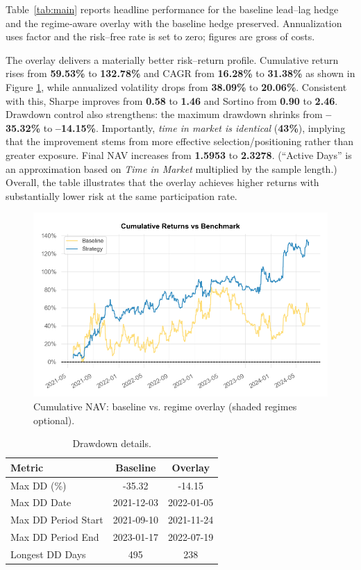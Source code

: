 Table~\ref{tab:main} reports headline performance for the baseline lead--lag hedge and the
regime‐aware overlay with the baseline hedge preserved. Annualization uses factor \annfac{}
and the risk–free rate is set to zero; figures are gross of costs.

The overlay delivers a materially better risk–return profile. Cumulative return rises from
\textbf{59.53\%} to \textbf{132.78\%} and CAGR from \textbf{16.28\%} to \textbf{31.38\%} as shown in Figure \ref{fig:nav}, while
annualized volatility drops from \textbf{38.09\%} to \textbf{20.06\%}. Consistent with this,
Sharpe improves from \textbf{0.58} to \textbf{1.46} and Sortino from \textbf{0.90} to
\textbf{2.46}. Drawdown control also strengthens: the maximum drawdown shrinks from
\textbf{--35.32\%} to \textbf{--14.15\%}. Importantly, \emph{time in market is identical}
(\textbf{43\%}), implying that the improvement stems from more effective selection/positioning
rather than greater exposure. Final NAV increases from \textbf{1.5953} to \textbf{2.3278}.
(“Active Days” is an approximation based on \emph{Time in Market} multiplied by the sample length.)
Overall, the table illustrates that the overlay achieves higher returns with substantially
lower risk at the same participation rate.

\begin{figure}[t]
\centering
\includegraphics[width=0.9\linewidth]{headline_plots/NAV.png}%
\caption{Cumulative NAV: baseline vs. regime overlay (shaded regimes optional).}
\label{fig:nav}
\end{figure}


\begin{table}[t]
\centering
\caption{Drawdown details.}
\label{tab:diag_dd}
\small
\begin{tabular}{lcc}
\toprule
Metric & Baseline & Overlay \\
\midrule
Max DD (\%)          & -35.32 & -14.15 \\
Max DD Date          & 2021-12-03 & 2022-01-05 \\
Max DD Period Start  & 2021-09-10 & 2021-11-24 \\
Max DD Period End    & 2023-01-17 & 2022-07-19 \\
Longest DD Days      & 495 & 238 \\
\bottomrule
\end{tabular}
\end{table}

